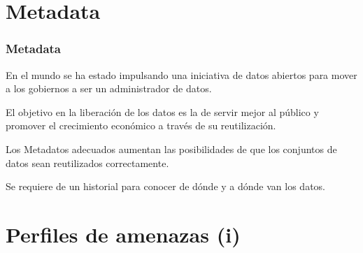 \documentclass{beamer}
\begin{document}
\section{Metadata}

\begin{frame}
\frametitle{Metadata}
\begin{block}{}
En el mundo se ha estado impulsando una iniciativa de datos abiertos para mover a los gobiernos a ser un administrador de datos. 
\end{block}

\begin{block}{}
El objetivo en la liberación de los datos es la de servir mejor al público y promover el crecimiento económico a través de su reutilización.
\end{block}

\begin{block}{}
Los Metadatos adecuados aumentan las posibilidades de que los conjuntos de datos sean reutilizados correctamente.
\end{block}

\begin{block}{}
Se requiere de un historial para conocer de dónde y a dónde van los datos.
\end{block}
\end{frame}

\section{Perfiles de amenazas (i)}
\end{document}
